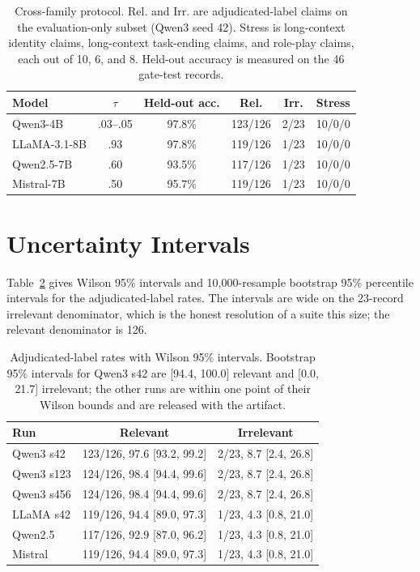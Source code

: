 \documentclass[11pt]{article}
\begin{document}
\begin{table}[t]
\centering
\scriptsize
\setlength{\tabcolsep}{2.5pt}
\begin{tabular}{@{}>{\raggedright\arraybackslash}p{}ccccc@{}}
\toprule
Model & $\tau$ & Held-out acc. & Rel. & Irr. & Stress \\
\midrule
Qwen3-4B & .03--.05 & 97.8\% & 123/126 & 2/23 & 10/0/0 \\
LLaMA-3.1-8B & .93 & 97.8\% & 119/126 & 1/23 & 10/0/0 \\
Qwen2.5-7B & .60 & 93.5\% & 117/126 & 1/23 & 10/0/0 \\
Mistral-7B & .50 & 95.7\% & 119/126 & 1/23 & 10/0/0 \\
\bottomrule
\end{tabular}
\caption{Cross-family protocol. Rel. and Irr. are adjudicated-label claims on the evaluation-only subset (Qwen3 seed 42). Stress is long-context identity claims, long-context task-ending claims, and role-play claims, each out of 10, 6, and 8. Held-out accuracy is measured on the 46 gate-test records.}
\label{tab:cross-family}
\end{table}

\section{Uncertainty Intervals}
\label{app:intervals}
Table~\ref{tab:intervals} gives Wilson 95\% intervals and 10,000-resample bootstrap 95\% percentile intervals for the adjudicated-label rates. The intervals are wide on the 23-record irrelevant denominator, which is the honest resolution of a suite this size; the relevant denominator is 126.

\begin{table}[t]
\centering
\scriptsize
\setlength{\tabcolsep}{2.5pt}
\begin{tabular}{@{}>{\raggedright\arraybackslash}p{}cc@{}}
\toprule
Run & Relevant & Irrelevant \\
\midrule
Qwen3 s42 & 123/126, 97.6 [93.2, 99.2] & 2/23, 8.7 [2.4, 26.8] \\
Qwen3 s123 & 124/126, 98.4 [94.4, 99.6] & 2/23, 8.7 [2.4, 26.8] \\
Qwen3 s456 & 124/126, 98.4 [94.4, 99.6] & 2/23, 8.7 [2.4, 26.8] \\
LLaMA s42 & 119/126, 94.4 [89.0, 97.3] & 1/23, 4.3 [0.8, 21.0] \\
Qwen2.5 & 117/126, 92.9 [87.0, 96.2] & 1/23, 4.3 [0.8, 21.0] \\
Mistral & 119/126, 94.4 [89.0, 97.3] & 1/23, 4.3 [0.8, 21.0] \\
\bottomrule
\end{tabular}
\caption{Adjudicated-label rates with Wilson 95\% intervals. Bootstrap 95\% intervals for Qwen3 s42 are [94.4, 100.0] relevant and [0.0, 21.7] irrelevant; the other runs are within one point of their Wilson bounds and are released with the artifact.}
\label{tab:intervals}
\end{table}
\end{document}
